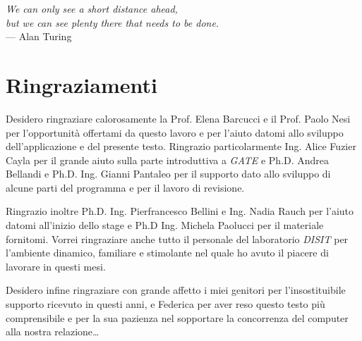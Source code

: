
\begin{flushright}{\slshape
    We can only see a short distance ahead, \\
    but we can see plenty there that needs to be done.} \\ \medskip
    --- Alan Turing
\end{flushright}



\bigskip

\begingroup
\let\clearpage\relax
\let\cleardoublepage\relax
\let\cleardoublepage\relax
\chapter*{Ringraziamenti}
Desidero ringraziare calorosamente la Prof. Elena Barcucci e il Prof. Paolo Nesi per
l'opportunit\`a offertami da questo lavoro e per l'aiuto datomi allo
sviluppo dell'applicazione e del presente testo. Ringrazio
particolarmente Ing. Alice Fuzier Cayla per il grande aiuto sulla
parte introduttiva a \emph{GATE} e Ph.D. Andrea Bellandi e Ph.D. Ing. Gianni Pantaleo
per il supporto dato allo sviluppo di alcune parti del programma e per il lavoro di revisione. 

Ringrazio inoltre Ph.D. Ing. Pierfrancesco Bellini e Ing. Nadia Rauch per l'aiuto datomi
all'inizio dello stage e Ph.D Ing. Michela Paolucci per il materiale
fornitomi. 
Vorrei ringraziare anche tutto il personale del laboratorio
\emph{DISIT} per l'ambiente dinamico, familiare e stimolante nel quale
ho avuto il piacere di lavorare in questi mesi.

Desidero infine ringraziare con grande affetto i miei genitori per
l'insostituibile supporto ricevuto in questi anni, e Federica per
aver reso questo testo pi\`u comprensibile e per la sua
pazienza nel sopportare la concorrenza del computer alla nostra
relazione\dots


\endgroup



